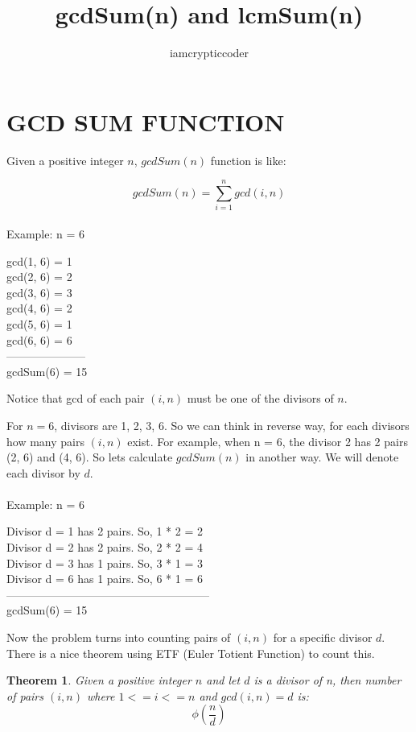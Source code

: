 \documentclass[a4paper,12pt]{article}
\newtheorem{theorem}{Theorem}
\begin{document}
\title{gcdSum(n) and lcmSum(n)}
\author{iamcrypticcoder}
\date{}
\maketitle
   

\section{GCD SUM FUNCTION}
Given a positive integer $n$, $gcdSum(n)$ function is like:

$$gcdSum(n) = \sum_{i=1}^n gcd(i, n)$$
\\
Example: n = 6

\begin{center}
gcd(1, 6) = 1\\
gcd(2, 6) = 2\\
gcd(3, 6) = 3\\
gcd(4, 6) = 2\\
gcd(5, 6) = 1\\
gcd(6, 6) = 6\\
---------------------\\
gcdSum(6) = 15
\end{center}

Notice that gcd of each pair $(i, n)$ must be one of the divisors of $n$. 

For $n = 6$, divisors are 1, 2, 3, 6. So we can think in reverse way, for each divisors how many pairs $(i, n)$ exist. For example, when n = 6, the divisor 2 has 2 pairs (2, 6) and (4, 6). So lets calculate $gcdSum(n)$ in another way. We will denote each divisor by $d$.
\\
\\
Example: n = 6
\begin{center}
Divisor d = 1 has 2 pairs. So, 1 * 2 = 2\\
Divisor d = 2 has 2 pairs. So, 2 * 2 = 4\\
Divisor d = 3 has 1 pairs. So, 3 * 1 = 3\\
Divisor d = 6 has 1 pairs. So, 6 * 1 = 6\\
------------------------------------------------------\\
gcdSum(6) = 15
\end{center}

Now the problem turns into counting pairs of $(i, n)$ for a specific divisor $d$.
There is a nice theorem using ETF (Euler Totient Function) to count this.
\\

\begin{theorem}
Given a positive integer $n$ and let $d$ is a divisor of n, then number of pairs $(i, n)$ where $1 <=  i <= n$ and $gcd(i, n) = d$ is: $$\phi({\frac{n}{d}})$$
\end{theorem}
\end{document}
